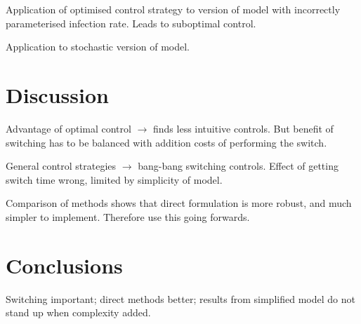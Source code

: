 Application of optimised control strategy to version of model with incorrectly parameterised infection rate. Leads to suboptimal control.

Application to stochastic version of model.

\section{Discussion}

Advantage of optimal control $\rightarrow$ finds less intuitive controls. But benefit of switching has to be balanced with addition costs of performing the switch.

General control strategies $\rightarrow$ bang-bang switching controls. Effect of getting switch time wrong, limited by simplicity of model.

Comparison of methods shows that direct formulation is more robust, and much simpler to implement. Therefore use this going forwards.

\section{Conclusions}

Switching important; direct methods better; results from simplified model do not stand up when complexity added.